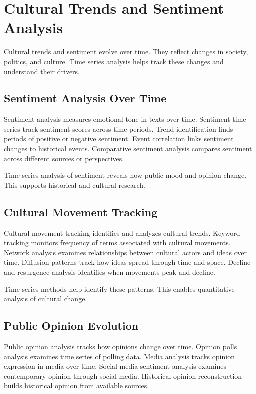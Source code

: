 \section{Cultural Trends and Sentiment Analysis}

Cultural trends and sentiment evolve over time. They reflect changes in society, politics, and culture. Time series analysis helps track these changes and understand their drivers.

\subsection{Sentiment Analysis Over Time}

Sentiment analysis measures emotional tone in texts over time. Sentiment time series track sentiment scores across time periods. Trend identification finds periods of positive or negative sentiment. Event correlation links sentiment changes to historical events. Comparative sentiment analysis compares sentiment across different sources or perspectives.

Time series analysis of sentiment reveals how public mood and opinion change. This supports historical and cultural research.

\subsection{Cultural Movement Tracking}

Cultural movement tracking identifies and analyzes cultural trends. Keyword tracking monitors frequency of terms associated with cultural movements. Network analysis examines relationships between cultural actors and ideas over time. Diffusion patterns track how ideas spread through time and space. Decline and resurgence analysis identifies when movements peak and decline.

Time series methods help identify these patterns. This enables quantitative analysis of cultural change.

\subsection{Public Opinion Evolution}

Public opinion analysis tracks how opinions change over time. Opinion polls analysis examines time series of polling data. Media analysis tracks opinion expression in media over time. Social media sentiment analysis examines contemporary opinion through social media. Historical opinion reconstruction builds historical opinion from available sources.

